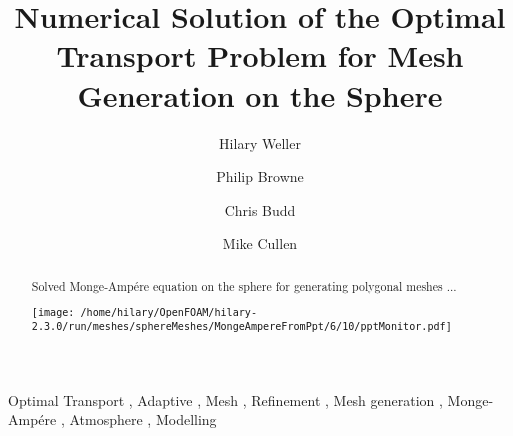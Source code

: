 \begin{frontmatter}

\title{Numerical Solution of the Optimal Transport Problem for Mesh Generation on the Sphere}

\author[label1]{Hilary Weller}
\author[label1]{Philip Browne}
\author[label2]{Chris Budd}
\author[label3]{Mike Cullen}
\address[label1]{Meteorology, University of Reading, UK}
\address[label2]{University of Bath, UK}
\address[label3]{Met Office, UK}

\begin{abstract}

Solved Monge-Amp\'ere equation on the sphere for generating polygonal meshes ... 


\texttt{[image: /home/hilary/OpenFOAM/hilary-2.3.0/run/meshes/sphereMeshes/MongeAmpereFromPpt/6/10/pptMonitor.pdf]}

\end{abstract}

\begin{keyword}
Optimal Transport \sep
Adaptive \sep
Mesh \sep
Refinement \sep
Mesh generation \sep
Monge-Amp\'ere \sep
Atmosphere \sep
Modelling
\end{keyword}

\end{frontmatter}

